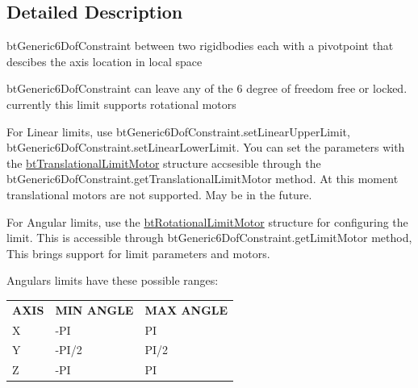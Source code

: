 \subsection{Detailed Description}
bt\+Generic6\+Dof\+Constraint between two rigidbodies each with a pivotpoint that descibes the axis location in local space 

bt\+Generic6\+Dof\+Constraint can leave any of the 6 degree of freedom \textquotesingle{}free\textquotesingle{} or \textquotesingle{}locked\textquotesingle{}. currently this limit supports rotational motors~\newline
 
\begin{DoxyItemize}
\item For Linear limits, use bt\+Generic6\+Dof\+Constraint.\+set\+Linear\+Upper\+Limit, bt\+Generic6\+Dof\+Constraint.\+set\+Linear\+Lower\+Limit. You can set the parameters with the \hyperlink{classbtTranslationalLimitMotor}{bt\+Translational\+Limit\+Motor} structure accsesible through the bt\+Generic6\+Dof\+Constraint.\+get\+Translational\+Limit\+Motor method. At this moment translational motors are not supported. May be in the future. 


\item For Angular limits, use the \hyperlink{classbtRotationalLimitMotor}{bt\+Rotational\+Limit\+Motor} structure for configuring the limit. This is accessible through bt\+Generic6\+Dof\+Constraint.\+get\+Limit\+Motor method, This brings support for limit parameters and motors. 


\item Angulars limits have these possible ranges\+: \tabulinesep=1mm
\begin{longtabu} spread 0pt [c]{*{3}{|X[-1]}|}
\hline
{\bfseries A\+X\+IS} &{\bfseries M\+IN A\+N\+G\+LE} &{\bfseries M\+AX A\+N\+G\+LE} \\
X &-\/\+PI &PI \\
Y &-\/\+P\+I/2 &P\+I/2 \\
Z &-\/\+PI &PI  \\
\end{longtabu}

\end{DoxyItemize}


